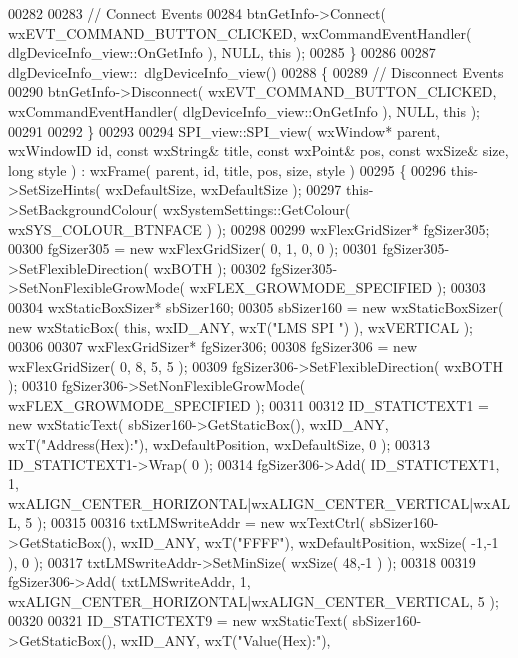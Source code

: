 \begin{DoxyCode}
00282     
00283     \textcolor{comment}{// Connect Events}
00284     btnGetInfo->Connect( wxEVT\_COMMAND\_BUTTON\_CLICKED, wxCommandEventHandler( 
      dlgDeviceInfo_view::OnGetInfo ), NULL, \textcolor{keyword}{this} );
00285 \}
00286 
00287 dlgDeviceInfo_view::~dlgDeviceInfo_view()
00288 \{
00289     \textcolor{comment}{// Disconnect Events}
00290     btnGetInfo->Disconnect( wxEVT\_COMMAND\_BUTTON\_CLICKED, wxCommandEventHandler( 
      dlgDeviceInfo_view::OnGetInfo ), NULL, \textcolor{keyword}{this} );
00291     
00292 \}
00293 
00294 SPI_view::SPI_view( wxWindow* parent, wxWindowID \textcolor{keywordtype}{id}, \textcolor{keyword}{const} wxString& title, \textcolor{keyword}{const} wxPoint& pos, \textcolor{keyword}{const} 
      wxSize& size, \textcolor{keywordtype}{long} style ) : wxFrame( parent, id, title, pos, size, style )
00295 \{
00296     this->SetSizeHints( wxDefaultSize, wxDefaultSize );
00297     this->SetBackgroundColour( wxSystemSettings::GetColour( wxSYS\_COLOUR\_BTNFACE ) );
00298     
00299     wxFlexGridSizer* fgSizer305;
00300     fgSizer305 = \textcolor{keyword}{new} wxFlexGridSizer( 0, 1, 0, 0 );
00301     fgSizer305->SetFlexibleDirection( wxBOTH );
00302     fgSizer305->SetNonFlexibleGrowMode( wxFLEX\_GROWMODE\_SPECIFIED );
00303     
00304     wxStaticBoxSizer* sbSizer160;
00305     sbSizer160 = \textcolor{keyword}{new} wxStaticBoxSizer( \textcolor{keyword}{new} wxStaticBox( \textcolor{keyword}{this}, wxID\_ANY, wxT(\textcolor{stringliteral}{"LMS SPI "}) ), wxVERTICAL );
00306     
00307     wxFlexGridSizer* fgSizer306;
00308     fgSizer306 = \textcolor{keyword}{new} wxFlexGridSizer( 0, 8, 5, 5 );
00309     fgSizer306->SetFlexibleDirection( wxBOTH );
00310     fgSizer306->SetNonFlexibleGrowMode( wxFLEX\_GROWMODE\_SPECIFIED );
00311     
00312     ID_STATICTEXT1 = \textcolor{keyword}{new} wxStaticText( sbSizer160->GetStaticBox(), wxID\_ANY, wxT(\textcolor{stringliteral}{"Address(Hex):"}), 
      wxDefaultPosition, wxDefaultSize, 0 );
00313     ID_STATICTEXT1->Wrap( 0 );
00314     fgSizer306->Add( ID_STATICTEXT1, 1, wxALIGN\_CENTER\_HORIZONTAL|wxALIGN\_CENTER\_VERTICAL|wxALL, 5 );
00315     
00316     txtLMSwriteAddr = \textcolor{keyword}{new} wxTextCtrl( sbSizer160->GetStaticBox(), wxID\_ANY, wxT(\textcolor{stringliteral}{"FFFF"}), wxDefaultPosition,
       wxSize( -1,-1 ), 0 );
00317     txtLMSwriteAddr->SetMinSize( wxSize( 48,-1 ) );
00318     
00319     fgSizer306->Add( txtLMSwriteAddr, 1, wxALIGN\_CENTER\_HORIZONTAL|wxALIGN\_CENTER\_VERTICAL, 5 );
00320     
00321     ID_STATICTEXT9 = \textcolor{keyword}{new} wxStaticText( sbSizer160->GetStaticBox(), wxID\_ANY, wxT(\textcolor{stringliteral}{"Value(Hex):"}), 

\end{DoxyCode}
